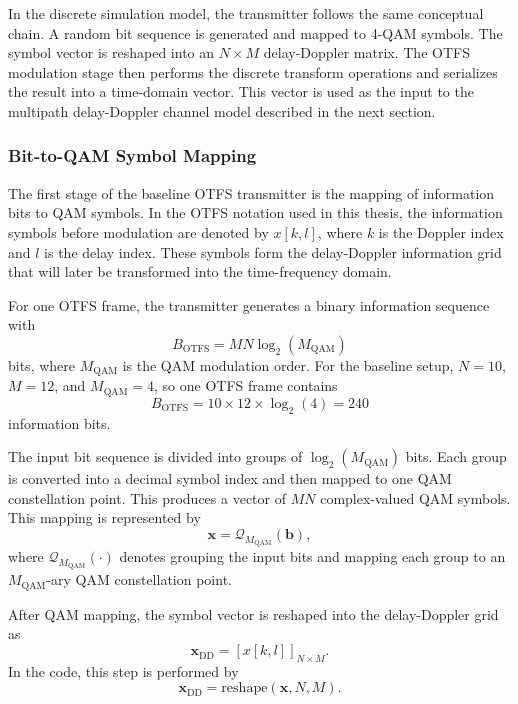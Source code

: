 In the discrete simulation model, the transmitter follows the same conceptual chain. A random bit sequence is generated and mapped to 4-QAM symbols. The symbol vector is reshaped into an \(N \times M\) delay-Doppler matrix. The OTFS modulation stage then performs the discrete transform operations and serializes the result into a time-domain vector. This vector is used as the input to the multipath delay-Doppler channel model described in the next section.

\subsubsection{Bit-to-QAM Symbol Mapping}

The first stage of the baseline OTFS transmitter is the mapping of information bits to QAM symbols. In the OTFS notation used in this thesis, the information symbols before modulation are denoted by \(x[k,l]\), where \(k\) is the Doppler index and \(l\) is the delay index. These symbols form the delay-Doppler information grid that will later be transformed into the time-frequency domain.

For one OTFS frame, the transmitter generates a binary information sequence with
\begin{equation}
    B_{\mathrm{OTFS}} = MN\log_2(M_{\mathrm{QAM}})
\end{equation}
bits, where \(M_{\mathrm{QAM}}\) is the QAM modulation order. For the baseline setup, \(N=10\), \(M=12\), and \(M_{\mathrm{QAM}}=4\), so one OTFS frame contains
\begin{equation}
    B_{\mathrm{OTFS}} = 10 \times 12 \times \log_2(4) = 240
\end{equation}
information bits.

The input bit sequence is divided into groups of \(\log_2(M_{\mathrm{QAM}})\) bits. Each group is converted into a decimal symbol index and then mapped to one QAM constellation point. This produces a vector of \(MN\) complex-valued QAM symbols. This mapping is represented by
\begin{equation}
    \mathbf{x}
    =
    \mathcal{Q}_{M_{\mathrm{QAM}}}
    \left(
    \mathbf{b}
    \right),
\end{equation}
where \(\mathcal{Q}_{M_{\mathrm{QAM}}}(\cdot)\) denotes grouping the input bits and mapping each group to an \(M_{\mathrm{QAM}}\)-ary QAM constellation point.

After QAM mapping, the symbol vector is reshaped into the delay-Doppler grid as
\begin{equation}
    \mathbf{x}_{\mathrm{DD}}
    =
    \left[
    x[k,l]
    \right]_{N \times M}.
\end{equation}
In the code, this step is performed by
\begin{equation}
    \mathbf{x}_{\mathrm{DD}}
    =
    \mathrm{reshape}(\mathbf{x},N,M).
\end{equation}

